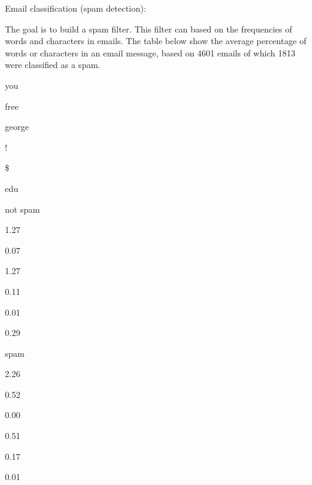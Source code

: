 \documentclass[ignorenonframetext,]{beamer}
\begin{document}
\begin{frame}

\begin{block}{Email classification (spam detection):}

The goal is to build a spam filter. This filter can based on the
frequencies of words and characters in emails. The table below show the
average percentage of words or characters in an email message, based on
4601 emails of which 1813 were classified as a spam.

you

free

george

!

\$

edu

not spam

1.27

0.07

1.27

0.11

0.01

0.29

spam

2.26

0.52

0.00

0.51

0.17

0.01

\end{block}

\end{frame}
\end{document}
